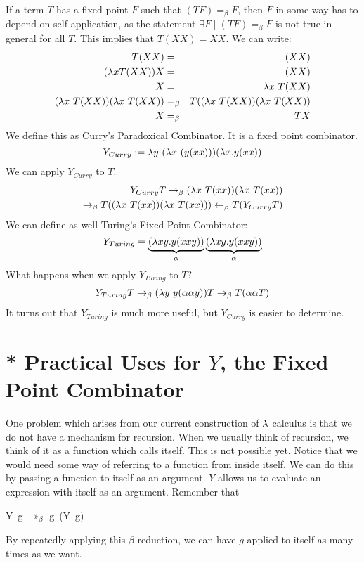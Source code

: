 If a term $T$ has a fixed point $F$ such that $(TF) =_\beta F$, then $F$ in some way has to depend on self application, as the statement $\exists F \mid (TF) =_\beta F$ is not true in general for all $T$. This implies that $T(XX) = XX$. We can write:
\begin{eqnarray*}
  T(XX) &=& (XX)\\
  (\l xT(XX))X &=& (XX)\\
  X &=& \l x\ T(XX)\\
  (\l x\ T(XX))(\l x\ T(XX)) &=_\beta& T((\l x\ T(XX))(\l x\ T(XX))\\
  X &=_\beta& TX\\
\end{eqnarray*}
We define this as Curry's Paradoxical Combinator. It is a fixed point combinator.
\begin{equation*}
  Y_{Curry} := \lambda y\ (\lambda x\ (y(xx)))(\lambda x.y(xx)) 
\end{equation*}
We can apply $Y_{Curry}$ to $T$.
\begin{eqnarray*}
  Y_{Curry}T \rightarrow_\beta (\lambda x\ T(xx))(\lambda x\ T(xx))\\
  \rightarrow_\beta T((\lambda x\ T(xx))(\lambda x\ T(xx))) \leftarrow_\beta T(Y_{Curry}T)
\end{eqnarray*}
We can define as well Turing's Fixed Point Combinator:
\begin{equation*}
  Y_{Turing} = \underbrace{(\lambda xy . y(xxy))}_{\alpha}\underbrace{(\lambda xy . y(xxy))}_{\alpha}
\end{equation*}
What happens when we apply $Y_{Turing}$ to $T$?
\begin{eqnarray*}
  Y_{Turing}T \rightarrow_\beta (\lambda y\ y(\alpha\alpha y))T \rightarrow_\beta T(\alpha\alpha T)
\end{eqnarray*}
It turns out that $Y_{Turing}$ is much more useful, but $Y_{Curry}$ is easier to determine.

\section{* Practical Uses for $Y$, the Fixed Point Combinator}
One problem which arises from our current construction of $\lambda$ calculus is that we do not have a mechanism for recursion. When we usually think of recursion, we think of it as a function which calls itself. This is not possible yet. Notice that we would need some way of referring to a function from inside itself. We can do this by passing a function to itself as an argument. $Y$ allows us to evaluate an expression with itself as an argument. Remember that
\begin{center}
  Y\ g $\twoheadrightarrow_\beta$ g\ (Y\ g)
\end{center}
By repeatedly applying this $\beta$ reduction, we can have $g$ applied to itself as many times as we want.\\

